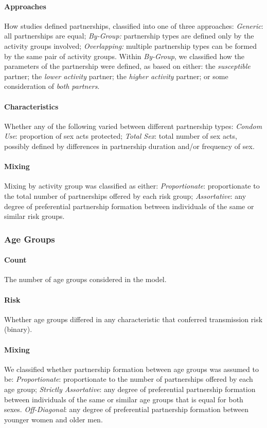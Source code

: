 \paragraph{Approaches}
How studies defined partnerships, classified into one of three approaches:
\emph{Generic}: all partnerships are equal;
\emph{By-Group:} partnership types are defined only by the activity groups involved;
\emph{Overlapping:} multiple partnership types can be formed by the same pair of activity groups.
Within \emph{By-Group}, we classified how the parameters of the partnership were defined, as based on either:
the \emph{susceptible} partner;
the \emph{lower activity} partner;
the \emph{higher activity} partner; or
some consideration of \emph{both partners}.
\paragraph{Characteristics}
Whether any of the following varied between different partnership types:
\emph{Condom Use}: proportion of sex acts protected;
\emph{Total Sex}: total number of sex acts, possibly defined by differences in
partnership duration and/or frequency of sex.
\paragraph{Mixing}
Mixing by activity group was classified as either:
\emph{Proportionate}: proportionate to the total number of partnerships offered by each risk group;
\emph{Assortative}: any degree of preferential partnership formation between
individuals of the same or similar risk groups.
\subsubsection{Age Groups}\label{app.sr.defs.age}
\paragraph{Count}
The number of age groups considered in the model.
\paragraph{Risk}
Whether age groups differed in any characteristic that conferred transmission risk (binary).
\paragraph{Mixing}
We classified whether partnership formation between age groups was assumed to be:
\emph{Proportionate}: proportionate to the number of partnerships offered by each age group;
\emph{Strictly Assortative}: any degree of preferential partnership formation between
individuals of the same or similar age groups that is equal for both sexes.
\emph{Off-Diagonal}: any degree of preferential partnership formation between younger women and older men.
